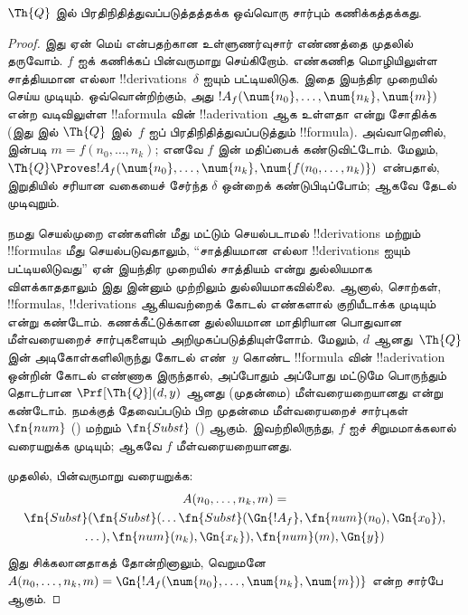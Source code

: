 \documentclass[../../../include/open-logic-section]{subfiles}
\begin{document}
\begin{lem}
$\Th{Q}$ இல் பிரதிநிதித்துவப்படுத்தத்தக்க ஒவ்வொரு சார்பும் கணிக்கத்தக்கது.
\end{lem}

\begin{proof}
இது ஏன் மெய் என்பதற்கான உள்ளுணர்வுசார் எண்ணத்தை முதலில் தருவோம்.
$f$ ஐக் கணிக்கப் பின்வருமாறு செய்கிறோம். எண்கணித மொழியிலுள்ள சாத்தியமான
எல்லா !!{derivation}s~$\delta$ ஐயும் பட்டியலிடுக. இதை இயந்திர முறையில்
செய்ய முடியும். ஒவ்வொன்றிற்கும், அது
$!A_f(\num{n_0}, \dots, \num{n_k}, \num{m})$ என்ற வடிவிலுள்ள
!!a{formula} வின் !!a{derivation} ஆக உள்ளதா என்று சோதிக்க
(இது  இல் $\Th{Q}$ இல்~$f$ ஐப் பிரதிநிதித்துவப்படுத்தும்
!!{formula}). அவ்வாறெனில்,  இன்படி
$m = f(n_0, \dots, n_k)$; எனவே $f$ இன் மதிப்பைக் கண்டுவிட்டோம். மேலும்,
$\Th{Q} \Proves !A_f(\num{n_0}, \dots, \num{n_k},
\num{f(n_0, \dots, n_k)})$ என்பதால், இறுதியில் சரியான வகையைச் சேர்ந்த
$\delta$ ஒன்றைக் கண்டுபிடிப்போம்; ஆகவே தேடல் முடிவுறும்.

நமது செயல்முறை எண்களின் மீது மட்டும் செயல்படாமல் !!{derivation}s மற்றும்
!!{formula}s மீது செயல்படுவதாலும், ``சாத்தியமான எல்லா
!!{derivation}s ஐயும் பட்டியலிடுவது'' ஏன் இயந்திர முறையில் சாத்தியம் என்று
துல்லியமாக விளக்காததாலும் இது இன்னும் முற்றிலும் துல்லியமாகவில்லை. ஆனால்,
சொற்கள், !!{formula}s, !!{derivation}s ஆகியவற்றைக் கோடல் எண்களால்
குறியீடாக்க முடியும் என்று கண்டோம். கணக்கீட்டுக்கான துல்லியமான மாதிரியான
பொதுவான மீள்வரையறைச் சார்புகளையும் அறிமுகப்படுத்தியுள்ளோம். மேலும்,
$d$ ஆனது~$\Th{Q}$ இன் அடிகோள்களிலிருந்து கோடல் எண்~$y$ கொண்ட
!!{formula} வின் !!a{derivation} ஒன்றின் கோடல் எண்ணாக இருந்தால், அப்போதும்
அப்போது மட்டுமே பொருந்தும் தொடர்பான $\Prf[\Th{Q}](d,y)$ ஆனது (முதன்மை)
மீள்வரையறையானது என்று கண்டோம். நமக்குத் தேவைப்படும் பிற முதன்மை
மீள்வரையறைச் சார்புகள் $\fn{num}$
()
மற்றும் $\fn{Subst}$
() ஆகும். இவற்றிலிருந்து, $f$ ஐச்
சிறுமமாக்கலால் வரையறுக்க முடியும்; ஆகவே $f$ மீள்வரையறையானது.

முதலில், பின்வருமாறு வரையறுக்க:
\begin{multline*}
  A(n_0, \dots, n_k, m) = \\
  \fn{Subst}(\fn{Subst}(\dots\fn{Subst}(\Gn{!A_f}, \fn{num}(n_0), \Gn{x_0}),\\ \dots),
  \fn{num}(n_k),  \Gn{x_k}), \fn{num}(m), \Gn{y})
\end{multline*}
இது சிக்கலானதாகத் தோன்றினாலும், வெறுமனே
$A(n_0, \dots, n_k, m) = \Gn{!A_f(\num{n_0}, \dots, \num{n_k},
\num{m})}$ என்ற சார்பே ஆகும்.


\end{proof}
\end{document}
